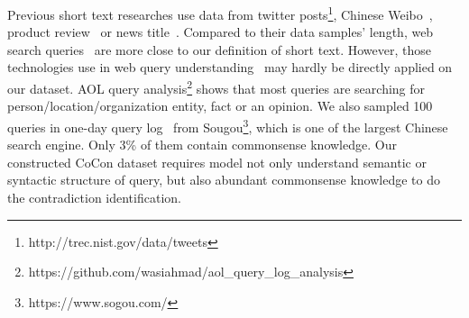 Previous short text researches use data from twitter posts\footnote{http://trec.nist.gov/data/tweets}, Chinese Weibo~\cite{he2016extracting}, product review~\cite{pang2005seeing} or news title~\cite{vitale2012classification}. Compared to their data samples' length, web search queries~\cite{pass2006picture,liu2011users,he2018dureader} are more close to our definition of short text.
However, those technologies use in web query understanding~\cite{hua2015short,wang2015query} may hardly be directly applied on our dataset. AOL query analysis\footnote{https://github.com/wasiahmad/aol\_query\_log\_analysis} shows that most queries are searching for person/location/organization entity, fact or an opinion. We also sampled 100 queries in one-day query log~\cite{liu2011users} from Sougou\footnote{https://www.sogou.com/}, which is one of the largest Chinese search engine. Only 3\% of them contain commonsense knowledge. 
Our constructed CoCon dataset %
requires model not only understand semantic or syntactic structure of query, but also abundant commonsense knowledge to do the contradiction identification.


